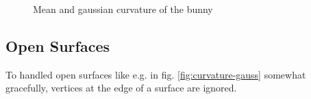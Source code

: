 \documentclass[a4paper,10pt,notitlepage]{scrreprt}
\begin{document}
\begin{figure}
 \caption{Mean and gaussian curvature of the bunny}
 \label{fig:curvature-bunny}
\end{figure}

\subsection{Open Surfaces}

To handled open surfaces like e.g. in fig. \ref{fig:curvature-gauss} somewhat
gracefully, vertices at the edge of a surface are ignored.
\end{document}
